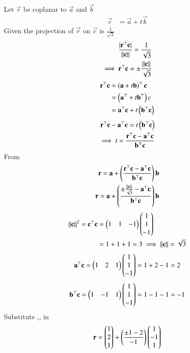 \documentclass[journal]{IEEEtran}
\begin{document}
Let $\vec{r}$ be coplanar to $\vec{a}$ and $\vec{b}$
\begin{align}
 \vec{r}&=\vec{a}+t\vec{b} 
 \end{align}
Given the projection of $\vec{r}$ on $\vec{c}$ is $\frac{1}{\sqrt{3}}$
\begin{align}
\frac{|\mathbf{r}^\top\mathbf{c}|}{\left\lVert\mathbf{c}\right\rVert} = \frac{1}{\sqrt{3}} \\
\implies \mathbf{r}^\top\mathbf{c}=\pm\frac{\left\lVert\mathbf{c}\right\rVert}{\sqrt{3}}
\end{align}
\begin{align}
\mathbf{r}^\top\mathbf{c}&=\left(\mathbf{a}+t\mathbf{b}\right)^\top\mathbf{c}\\
&=\left(\mathbf{a}^\top+t\mathbf{b}^\top\right)c \\
&=\mathbf{a}^\top\mathbf{c}+t\left(\mathbf{b}^\top\mathbf{c}\right) 
\end{align}
\begin{align}
\mathbf{r}^\top\mathbf{c}-\mathbf{a}^\top\mathbf{c}=t\left(\mathbf{b}^\top\mathbf{c}\right)  \\
\implies t=\frac{\mathbf{r}^\top\mathbf{c}-\mathbf{a}^\top\mathbf{c}}{\mathbf{b}^\top\mathbf{c}}
\end{align}
From 
\begin{align}
    \mathbf{r}=\mathbf{a}+\left(\frac{\mathbf{r}^\top\mathbf{c}-\mathbf{a}^\top\mathbf{c}}{\mathbf{b}^\top\mathbf{c}}\right)\mathbf{b} \\
    \mathbf{r}=\mathbf{a}+\left(\frac{\pm\frac{\left\lVert\mathbf{c}\right\rVert}{\sqrt{3}}-\mathbf{a}^\top\mathbf{c}}{\mathbf{b}^\top\mathbf{c}}\right)\mathbf{b}
\end{align}
\begin{align}
\left\lVert\mathbf{c}\right\rVert^2=\mathbf{c}^\top\mathbf{c}&=\begin{pmatrix}1&1&-1\end{pmatrix}\begin{pmatrix}1\\1\\-1\end{pmatrix} \\
&=1+1+1=3  \implies \left\lVert\mathbf{c}\right\rVert=\sqrt{3}
\end{align}  
\begin{align}
\mathbf{a}^\top\mathbf{c}=\begin{pmatrix}1&2&1\end{pmatrix}\begin{pmatrix}1\\1\\-1\end{pmatrix}=1+2-1=2 
\end{align}
\begin{align}
\mathbf{b}^\top\mathbf{c}=\begin{pmatrix}1&-1&1\end{pmatrix}\begin{pmatrix}1\\1\\-1\end{pmatrix}=1-1-1=-1 \\
\end{align}
Substitute ,, in  \\
\begin{align}
\mathbf{r}=\begin{pmatrix}1\\2\\1\end{pmatrix}+\left(\frac{\pm1-2}{-1}\right)\begin{pmatrix}1\\-1\\1\end{pmatrix} 
\end{align}
\end{document}
